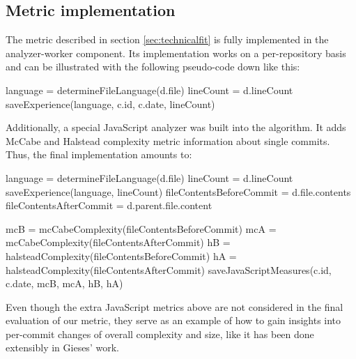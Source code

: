 \subsection{Metric implementation}\label{sec:metric-implementation}
The metric described in section \ref{sec:technicalfit} is fully implemented in the analyzer-worker component. Its implementation works on a per-repository basis and can be illustrated with the following pseudo-code down like this:\\[.25em]

\begin{algorithmic}
    \State language = determineFileLanguage(d.file)
    \State lineCount = d.lineCount
    \State saveExperience(language, c.id, c.date, lineCount)
  \EndFor
\EndFor
\end{algorithmic}
\vspace{0.75em}

Additionally, a special JavaScript analyzer was built into the algorithm. It adds McCabe\cite{mc:1976} and Halstead\cite{h:1977} complexity metric information about single commits. Thus, the final implementation amounts to:\\[.25em]

\begin{minipage}{\linewidth}
\begin{algorithmic}
    \State language = determineFileLanguage(d.file)
    \State lineCount = d.lineCount
    \State saveExperience(language, lineCount)
    \State
      \State fileContentsBeforeCommit = d.file.contents
      \State fileContentsAfterCommit  = d.parent.file.content

      \State mcB = mcCabeComplexity(fileContentsBeforeCommit)
      \State mcA = mcCabeComplexity(fileContentsAfterCommit)
      \State hB = halsteadComplexity(fileContentsBeforeCommit)
      \State hA = halsteadComplexity(fileContentsAfterCommit)
      \State
      \State saveJavaScriptMeasures(c.id, c.date, mcB, mcA, hB, hA)
    \EndIf
  \EndFor
\EndFor
\end{algorithmic}
\end{minipage}
\vspace{0.75em}

Even though the extra JavaScript metrics above are not considered in the final evaluation of our metric, they serve as an example of how to gain insights into per-commit changes of overall complexity and size, like it has been done extensibly in Gieses' work\cite{pg:2014}.

